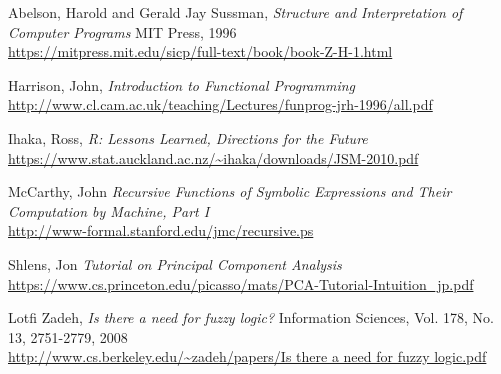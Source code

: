 \begin{thebibliography}{9}
  Abelson, Harold and Gerald Jay Sussman,
  \emph{Structure and Interpretation of Computer Programs}
  MIT Press, 1996 \\
  \url{https://mitpress.mit.edu/sicp/full-text/book/book-Z-H-1.html}

  Harrison, John,
  \emph{Introduction to Functional Programming} \\
  \url{http://www.cl.cam.ac.uk/teaching/Lectures/funprog-jrh-1996/all.pdf}

  Ihaka, Ross, 
  \emph{R: Lessons Learned, Directions for the Future} \\
  \url{https://www.stat.auckland.ac.nz/~ihaka/downloads/JSM-2010.pdf}

  McCarthy, John
  \emph{Recursive Functions of Symbolic Expressions and Their Computation by Machine, Part I} \\
  \url{http://www-formal.stanford.edu/jmc/recursive.ps}

  Shlens, Jon
  \emph{Tutorial on Principal Component Analysis}
  \url{https://www.cs.princeton.edu/picasso/mats/PCA-Tutorial-Intuition_jp.pdf}

  Lotfi Zadeh, 
  \emph{Is there a need for fuzzy logic?}
  Information Sciences, Vol. 178, No. 13, 2751-2779, 2008 \\
  \url{http://www.cs.berkeley.edu/~zadeh/papers/Is there a need for fuzzy logic.pdf}

\end{thebibliography}
